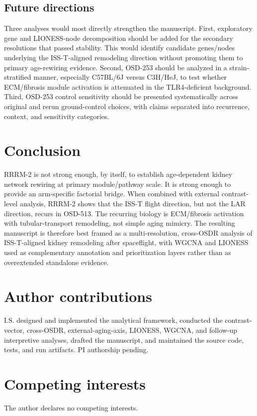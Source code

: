 \documentclass[11pt]{article}
\begin{document}
\subsection{Future directions}

Three analyses would most directly strengthen the manuscript. First, exploratory gene and LIONESS-node decomposition should be added for the secondary resolutions that passed stability. This would identify candidate genes/nodes underlying the ISS-T-aligned remodeling direction without promoting them to primary age-rewiring evidence. Second, OSD-253 should be analyzed in a strain-stratified manner, especially C57BL/6J versus C3H/HeJ, to test whether ECM/fibrosis module activation is attenuated in the TLR4-deficient background. Third, OSD-253 control sensitivity should be presented systematically across original and rerun ground-control choices, with claims separated into recurrence, context, and sensitivity categories.

\section{Conclusion}

RRRM-2 is not strong enough, by itself, to establish age-dependent kidney network rewiring at primary module/pathway scale. It is strong enough to provide an arm-specific factorial bridge. When combined with external contrast-level analysis, RRRM-2 shows that the ISS-T flight direction, but not the LAR direction, recurs in OSD-513. The recurring biology is ECM/fibrosis activation with tubular-transport remodeling, not simple aging mimicry. The resulting manuscript is therefore best framed as a multi-resolution, cross-OSDR analysis of ISS-T-aligned kidney remodeling after spaceflight, with WGCNA and LIONESS used as complementary annotation and prioritization layers rather than as overextended standalone evidence.

\section*{Author contributions}
I.S. designed and implemented the analytical framework, conducted the contrast-vector, cross-OSDR, external-aging-axis, LIONESS, WGCNA, and follow-up interpretive analyses, drafted the manuscript, and maintained the source code, tests, and run artifacts. PI authorship pending.

\section*{Competing interests}
The author declares no competing interests.
\end{document}
